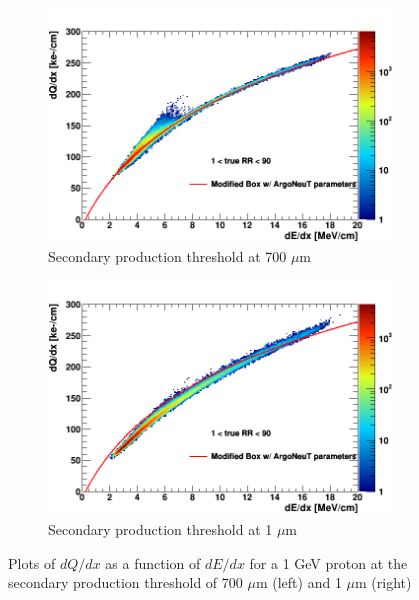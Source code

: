 \begin{figure}[htbp!]
        \centering
        \begin{subfigure}[b]{0.495\textwidth}
            \centering
            \includegraphics[width=\textwidth]{proton_700um}
            \caption{Secondary production threshold at 700 $\mu$m}%
            \label{fig:proton_2d_700}
        \end{subfigure}
        \hfill
        \begin{subfigure}[b]{0.495\textwidth}  
            \centering 
            \includegraphics[width=\textwidth]{proton_1um}
            \caption{Secondary production threshold at 1 $\mu$m}%
            \label{fig:proton_2d_1}
        \end{subfigure}
        \caption{Plots of $dQ/dx$ as a function of $dE/dx$ for a 1 GeV proton at the secondary production threshold of 700 $\mu$m (left) and 1 $\mu$m (right)}
        \label{fig:proton_2d}
\end{figure}


